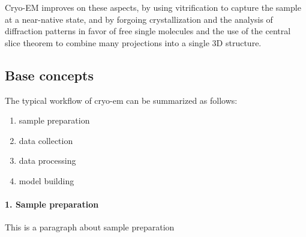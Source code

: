 Cryo-EM improves on these aspects, by using vitrification to capture the sample at a near-native state, and by forgoing crystallization and the analysis of diffraction patterns in favor of free single molecules and the use of the central slice theorem to combine many projections into a single 3D structure.

\subsection{Base concepts}

The typical workflow of cryo-em can be summarized as follows:

\begin{enumerate}[noitemsep]
\item sample preparation
\item data collection
\item data processing
\item model building
\end{enumerate}

\paragraph{1. Sample preparation} This is a paragraph about sample preparation

